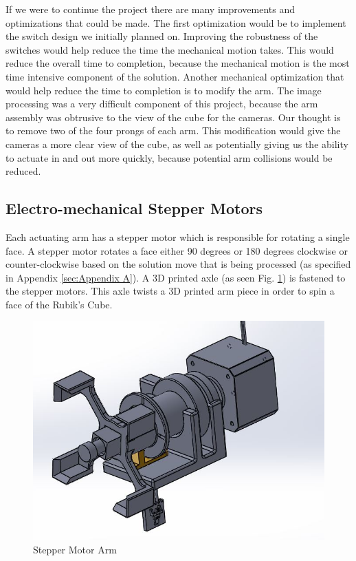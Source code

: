 \documentclass[final, letterpaper, 10 pt, conference, onecolumn]{IEEEtran}
\begin{document}
If we were to continue the project there are many improvements and optimizations that could be made. The first optimization would be to implement the switch design we initially planned on.  Improving the robustness of the switches would help reduce the time the mechanical motion takes. This would reduce the overall time to completion, because the mechanical motion is the most time intensive component of the solution. 
Another mechanical optimization that would help reduce the time to completion is to modify the arm.  The image processing was a very difficult component of this project, because the arm assembly was obtrusive to the view of the cube for the cameras.  Our thought is to remove two of the four prongs of each arm.  This modification would give the cameras a more clear view of the cube, as well as potentially giving us the ability to actuate in and out more quickly, because potential arm collisions would be reduced.

\subsection{Electro-mechanical Stepper Motors}
\label{sec:Stepper Motors}
Each actuating arm has a stepper motor which is responsible for rotating a single face. A stepper motor rotates a face either 90 degrees or 180 degrees clockwise or counter-clockwise based on the solution move that is being processed (as specified in Appendix \ref{sec:Appendix A}). A 3D printed axle (as seen Fig. \ref{fig:Stepper Motor Arm}) is fastened to the stepper motors. This axle twists a 3D printed arm piece in order to spin a face of the Rubik's Cube.

\begin{figure}[!ht]
\centering
\includegraphics[scale=0.5]{StepperMotorArm.jpg}
\caption{Stepper Motor Arm}
\label{fig:Stepper Motor Arm}
\end{figure}
\end{document}
